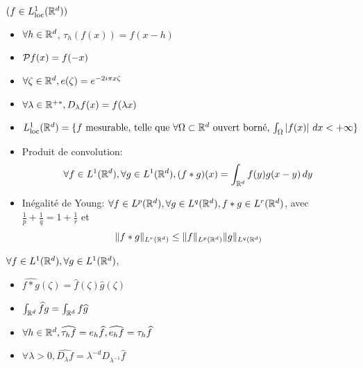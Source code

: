 \documentclass[]{report}
\begin{document}
    \begin{nt}{}{}
        $(f\in L_{\text{loc}}^1(\mathbb{R}^d))$
        \begin{itemize}
            \item $\forall h\in \mathbb{R}^d$, $\tau_h(f(x))=f(x-h)$
            \item $\mathcal{P} f(x)=f(-x)$
            \item $\forall \zeta\in \mathbb{R}^d,e(\zeta)=e^{-2i\pi x\zeta}$
            \item $\forall \lambda\in\mathbb{R}^{+*},D_\lambda f(x)=f(\lambda x)$
            \item $L_{\text{loc}}^1(\mathbb{R}^d)=\{f\text{ mesurable, telle que $\forall \Omega\subset \mathbb{R}^d$ ouvert borné, $\int_{\Omega} \left|f(x)\right|\,dx <+\infty$}\}$
        \end{itemize}
    \end{nt}

    \begin{ra}{}{}
        \begin{itemize}
            \item Produit de convolution:
            \[\forall f\in L^1(\mathbb{R}^d),\forall g\in L^1(\mathbb{R}^d),(f*g)(x)=\int_{\mathbb{R}^d}f(y)g(x-y)\, dy\]
            \item Inégalité de Young: $\forall f\in L^p(\mathbb{R}^d),\forall g\in L^q(\mathbb{R}^d),f*g\in L^r(\mathbb{R}^d)$, avec $\frac{1}{p}+\frac{1}{q}=1+\frac{1}{r}$ et
            \[\lVert f*g \rVert_{L^r(\mathbb{R}^d)}\le \lVert f \rVert_{L^p(\mathbb{R}^d)}\lVert g \rVert_{L^q(\mathbb{R}^d)}\]
        \end{itemize}
    \end{ra}

    \begin{prop}{}{}
        $\forall f\in L^1(\mathbb{R}^d),\forall g\in L^1(\mathbb{R}^d)$,
        \begin{itemize}
            \item $\widehat{f*g}(\zeta)=\widehat{f}(\zeta)\widehat{g}(\zeta)$
            \item $\int_{\mathbb{R}^d}\widehat{f}g=\int_{\mathbb{R}^d}f\widehat{g}$
            \item $\forall h\in \mathbb{R}^d, \widehat{\tau_h f}=e_h\widehat{f}, \widehat{e_h f}=\tau_h \widehat{f}$
            \item $\forall \lambda >0, \widehat{D_\lambda f}=\lambda^{-d}D_{\lambda^{-1}}\widehat{f}$
        \end{itemize}
    \end{prop}
\end{document}
